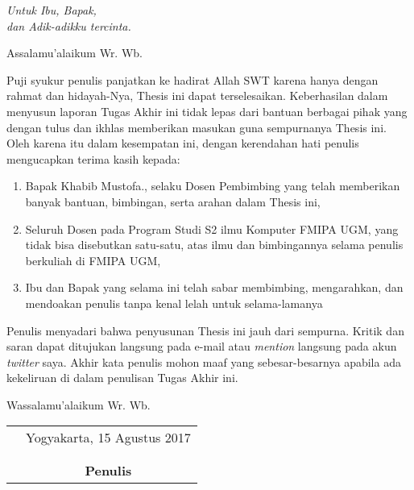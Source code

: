 \documentclass{mipathesis}
\begin{document}
\cover

\approvalpage

\acknowledgment
\begin{flushright}
\emph{Untuk Ibu, Bapak,\\dan Adik-adikku tercinta.}
\end{flushright}

\preface
Assalamu'alaikum Wr. Wb.

\vspace{0.5cm}

Puji syukur penulis panjatkan ke hadirat Allah SWT karena hanya dengan rahmat dan hidayah-Nya, Thesis ini dapat terselesaikan. Keberhasilan dalam menyusun laporan Tugas Akhir ini tidak lepas dari bantuan berbagai pihak yang dengan tulus dan ikhlas memberikan masukan guna sempurnanya Thesis ini. Oleh karena itu dalam kesempatan ini, dengan kerendahan hati penulis mengucapkan terima kasih kepada:

\begin{enumerate}
\item{Bapak Khabib Mustofa., selaku Dosen Pembimbing yang telah memberikan banyak bantuan, bimbingan, serta arahan dalam Thesis ini,}
\item{Seluruh Dosen pada Program Studi S2 ilmu Komputer FMIPA UGM, yang tidak bisa disebutkan satu-satu, atas ilmu dan bimbingannya selama penulis berkuliah di FMIPA UGM,}
\item{Ibu dan Bapak yang selama ini telah sabar membimbing, mengarahkan, dan mendoakan penulis tanpa kenal lelah untuk selama-lamanya}
\end{enumerate}

Penulis menyadari bahwa penyusunan Thesis ini jauh dari sempurna. Kritik dan saran dapat ditujukan langsung pada e-mail atau \emph{mention} langsung pada akun \emph{twitter} saya. Akhir kata penulis mohon maaf yang sebesar-besarnya apabila ada kekeliruan di dalam penulisan Tugas Akhir ini.

\vspace{0.5cm}

Wassalamu'alaikum Wr. Wb.

\begin{tabular}{p{7.5cm}c}
&Yogyakarta, 15 Agustus 2017\\
&\\
&\\
&\textbf{Penulis}
\end{tabular}
\end{document}
